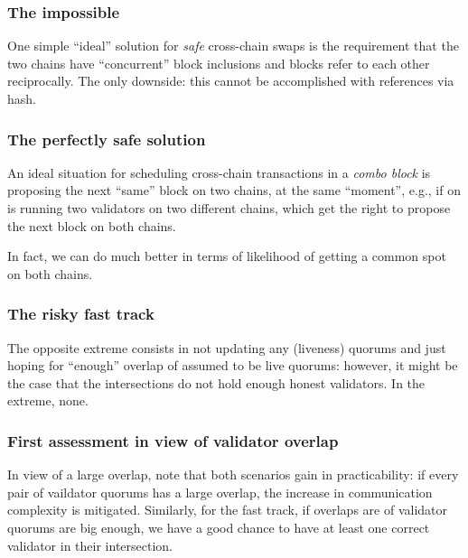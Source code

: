 \documentclass{article}
\theoremstyle{definition}
\begin{document}
\subsubsection{The impossible}
\label{sec:impossible-concurrency}

One simple 
``ideal'' solution for \emph{safe}
cross-chain swaps is the requirement that
the two chains have
``concurrent'' block inclusions
and blocks refer to each other reciprocally.
The only downside:
this cannot be accomplished with references via hash.

\subsubsection{The perfectly safe solution}
\label{sec:perfectly-safe}

An ideal situation for
scheduling cross-chain transactions
in a \emph{combo block}  
is proposing the next ``same'' block on two chains,
at the same “moment”,
e.g., if on is running two validators on two different chains,
which get the right to propose the next block on both chains.

In fact, 
we can do much better
in terms of likelihood of getting a common spot
on both chains.

\subsubsection{The risky fast track}
\label{sec:fast-n-furious}

The opposite extreme consists in
not updating any (liveness) quorums
and just hoping for “enough” overlap 
of assumed to be live quorums:
however,
it might be the case
that the intersections do 
not hold enough honest validators.
In the extreme,
none.

\subsubsection{First assessment in view of validator overlap}
\label{sec:assessment-i}

In view of a large overlap,
note that both scenarios gain in practicability:
if every pair of vaildator quorums
has a large overlap,
the increase in communication complexity is mitigated.
Similarly,
for the fast track, 
if overlaps are of validator quorums are big enough,
we have a good chance to have at least 
one correct validator in their intersection.
\end{document}
